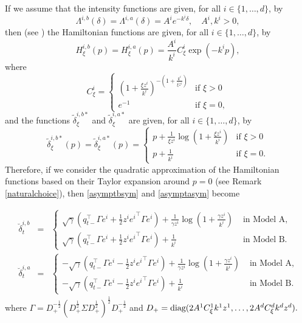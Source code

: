\documentclass[preprint, 3p]{elsarticle}
\newcommand{\1}{{\chi}}
\begin{document}
If we assume that the intensity functions are given, for all $i \in \{1, \ldots, d\}$, by
\[    \Lambda^{i,b} (\delta) = \Lambda^{i,a} (\delta) = A^{i} e^{-k^{i} \delta}, \quad A^i, k^i > 0,\]
then (see \cite{gueant2017optimal}) the Hamiltonian functions are given, for all $i \in \{1, \ldots, d\}$, by
\[H^{i,b}_\xi (p)
   =  H^{i,a}_\xi (p) = \frac{A^{i}}{k^{i}} C^{i}_\xi \exp(-k^{i} p), \]
 where
 \[ C_\xi^i =
 \begin{cases}
 \left(1+\frac{\xi z^i}{k^{i}}\right)^{-\left(1+\frac{k^{i}}{\xi z^i}\right)}&\mbox{if }\xi>0\\
 e^{-1}&\mbox{if }\xi=0,
 \end{cases} \]
 and the functions $\tilde{\delta}^{i,b*}_\xi$ and $\tilde{\delta}^{i,a*}_\xi$ are given, for all $i \in \{1, \ldots, d\}$, by
\[\tilde\delta^{i,b*}_\xi (p)
   =  \tilde\delta^{i,a*}_\xi (p) = \begin{cases}
 p + \frac{1}{\xi z^i}\log\left(1+\frac{\xi z^i}{k^{i}}\right)&\mbox{if }\xi>0\\
 p + \frac{1}{k^i}&\mbox{if }\xi=0.
 \end{cases} \]
Therefore, if we consider the quadratic approximation of the Hamiltonian functions based on their Taylor expansion around $p=0$ (see Remark \ref{naturalchoice}), then \eqref{asymptbsym} and \eqref{asymptasym} become

\begin{eqnarray*}
	\breve\delta^{i,b}_t &=& \begin{cases}
 \sqrt{\gamma} \left( q_{t-}^\intercal \Gamma e^i + \frac 12 z^i {e^i}^\intercal \Gamma e^i \right)
 +\frac{1}{\gamma z^i}\log\left(1+\frac{\gamma z^i}{k^{i}}\right)  &\mbox{ in Model A,}\\
 \sqrt{\gamma} \left(  q_{t-}^\intercal \Gamma e^i + \frac 12 z^i {e^i}^\intercal \Gamma e^i \right)
 +\frac{1}{k^i} &\mbox{ in  Model B.}
\end{cases}\\
	\breve\delta^{i,a}_t &=& \begin{cases}
-\sqrt{\gamma} \left( q_{t-}^\intercal \Gamma e^i - \frac 12 z^i {e^i}^\intercal \Gamma e^i \right)
+\frac{1}{\gamma z^i}\log\left(1+\frac{\gamma z^i}{k^{i}}\right)  &\mbox{ in Model A,}\\
-\sqrt{\gamma} \left( q_{t-}^\intercal \Gamma e^i - \frac 12 z^i {e^i}^\intercal \Gamma e^i \right)
+\frac{1}{k^i} &\mbox{ in Model B.}
\end{cases}
	\end{eqnarray*}
where $\Gamma=D_+^{-\frac 1 2}(D_+^{\frac 12}\Sigma D_+^{\frac 12})^{\frac 12} D_+^{-\frac 1 2}$ and $D_+=\textup{diag}(2A^1 C_\xi^1 k^1 z^1 ,\ldots, 2A^d C_\xi^d k^d z^d).$\\
\end{document}
